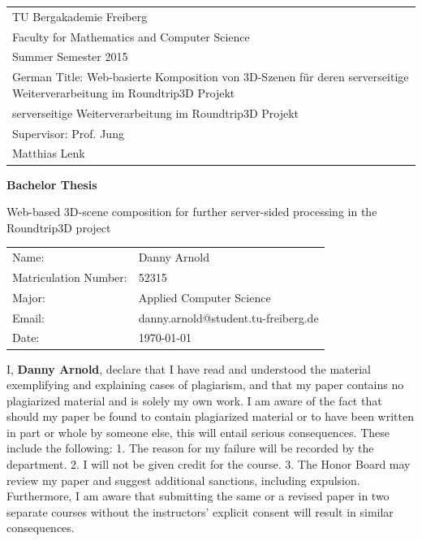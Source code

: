 \documentclass[
	 11pt,         %
	 a4paper,      %
	 oneside,
	 ]{article}
\newcommand{\mytitle}{Web-based 3D-scene composition for further server-sided processing in the Roundtrip3D project}
\newcommand{\myauthor}{Danny Arnold}
\newcommand{\myseminar}{Web-basierte Komposition von 3D-Szenen für deren serverseitige Weiterverarbeitung im Roundtrip3D Projekt}
\newcommand{\mydozent}{Prof. Jung}
\newcommand{\mydozentTwo}{Matthias Lenk}
\newcommand{\myseminarTwo}{serverseitige Weiterverarbeitung im Roundtrip3D Projekt}
\newcommand{\mysemester}{Summer Semester 2015}
\newcommand{\emptypage}[0]{
	\clearpage
	\thispagestyle{empty}
	\mbox{}
	\newpage
}
\begin{document}
\begin{titlepage}
\begin{tabular}[l]{l}
TU Bergakademie Freiberg\\
Faculty for Mathematics and Computer Science\\
\mysemester\\
German Title: \myseminar\\
\phantom{German Title: }\myseminarTwo\\
Supervisor: \mydozent\\
\phantom{Supervisor: }\mydozentTwo\\
\end{tabular}

\vspace{4cm}
\begin{center}
\textbf{\large Bachelor Thesis} %
\vspace{0.5\baselineskip}

{\huge
\mytitle
}
\end{center}

\vfill
\begin{tabular}[l]{ll}
Name:           & \myauthor\\
Matriculation Number: & 52315\\
Major:    & Applied Computer Science\\
Email: & danny.arnold@student.tu-freiberg.de\\
Date: & \today \\
\end{tabular}

\end{titlepage}
\newpage

\emptypage

\onehalfspacing


\thispagestyle{empty}
\vspace*{100pt}
I, \textbf{\myauthor}, declare that I have read and understood
the material exemplifying and explaining cases of plagiarism, and that my paper contains no plagiarized
material and is solely my own work. I am aware of the fact that should my paper be found to
contain plagiarized material or to have been written in part or whole by someone else, this will
entail serious consequences. These include the following:
1. The reason for my failure will be recorded by the department.
2. I will not be given credit for the course.
3. The Honor Board may review my paper and suggest additional sanctions, including
expulsion.
Furthermore, I am aware that submitting the same or a revised paper in two separate courses without
the instructors' explicit consent will result in similar consequences.\cite{Antiplagiatserklrung}
\vspace*{50pt}
\end{document}
